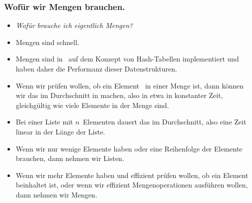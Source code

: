 \documentclass[aspectratio=169,mathserif,notheorems]{beamer}%
\begin{document}
\begin{frame}%
\frametitle{Wofür wir Mengen brauchen.}%
\begin{itemize}%
\item \emph{Wofür brauche ich eigentlich Mengen?}%
%
%
\item<4-> Mengen sind schnell.%
%
\item<5-> Mengen sind in \python\ auf dem Konzept von Hash-Tabellen implementiert und haben daher die Performanz dieser Datenstrukturen\cite{K1998SAS,CLRS2009ITA,SKS2019DSC}.%
%
\item<6-> Wenn wir prüfen wollen, ob ein Element~ in einer Menge ist, dann können wir das im Durchschnitt in  machen, also in etwa in konstanter Zeit, gleichgültig wie viele Elemente in der Menge sind\cite{H2025PM:PBOTTCODDSIPP33,PSF:TPW:TC,N2022CCSFPO}.%
%
\item<7-> Bei einer Liste mit $n$~Elementen dauert das  im Durchschnitt, also eine Zeit linear in der Länge der Liste.
%
\item<8-> Wenn wir nur wenige Elemente haben oder eine Reihenfolge der Elemente brauchen, dann nehmen wir Listen.%
%
\item<9-> Wenn wir mehr Elemente haben und effizient prüfen wollen, ob ein Element beinhaltet ist, oder wenn wir effizient Mengenoperationen ausführen wollen, dann nehmen wir Mengen.%
\end{itemize}%
\end{frame}%
%
\end{document}
